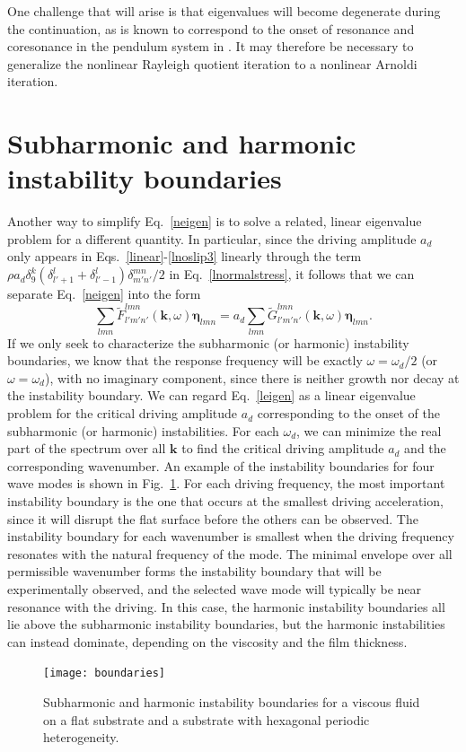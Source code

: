\documentclass[aps,pre,amsmath,amssymb,floatfix,onecolumn,notitlepage,10pt]{revtex4-1}
\begin{document}
One challenge that will arise is that eigenvalues will become degenerate during the continuation, as is known to correspond to the onset of resonance and coresonance in the pendulum system in \cite{2021_Nicolaou_2}. It may therefore be necessary to generalize the nonlinear Rayleigh quotient iteration to a nonlinear Arnoldi iteration.

\section{Subharmonic and harmonic instability boundaries}
Another way to simplify Eq.~\eqref{neigen} is to solve a related, linear eigenvalue problem for a different quantity. In particular, since the driving amplitude $a_d$ only appears in Eqs.~\eqref{linear}-\eqref{lnoslip3} linearly through the term $\rho a_d\delta_9^k(\delta_{l'+1}^l+\delta_{l'-1}^l)\delta_{m'n'}^{mn}/2$ in Eq.~\eqref{lnormalstress}, it follows that we can separate Eq.~\eqref{neigen} into the form
\begin{equation}
\sum_{lmn} \tilde{F}^{lmn}_{l'm'n'}(\mathbf{k},\omega) \bm{\eta}_{lmn} = a_d \sum_{lmn}  \tilde{G}^{lmn}_{l'm'n'}(\mathbf{k},\omega)\bm{\eta}_{lmn}. \label{leigen}
\end{equation}
If we only seek to characterize the subharmonic (or harmonic) instability boundaries, we know that the response frequency will be exactly $\omega  = \omega_d/2$ (or $\omega  = \omega_d$), with no imaginary component, since there is neither growth nor decay at the instability boundary. We can regard Eq.~\eqref{leigen} as a linear eigenvalue problem for the critical driving amplitude $a_d$ corresponding to the onset of the subharmonic (or harmonic) instabilities. For each $\omega_d$, we can minimize the real part of the spectrum over all $\mathbf{k}$ to find the critical driving amplitude $a_d$ and the corresponding wavenumber. An example of the instability boundaries for four wave modes is shown in Fig.~\ref{fig3}. For each driving frequency, the most important instability boundary is the one that occurs at the smallest driving acceleration, since it will disrupt the flat surface before the others can be observed.  The instability boundary for each wavenumber is smallest when the driving frequency resonates with the natural frequency of the mode. The minimal envelope over all permissible wavenumber forms the instability boundary that will be experimentally observed, and the selected wave mode will typically be near resonance with the driving. In this case, the harmonic instability boundaries all lie above the subharmonic instability boundaries, but the harmonic instabilities can instead dominate, depending on the viscosity and the film thickness. 
\begin{figure}[hbt]
\texttt{[image: boundaries]}
\caption{Subharmonic and harmonic instability boundaries for a viscous fluid on a flat substrate and a substrate with hexagonal periodic heterogeneity. \label{fig3}}
\end{figure}
\end{document}
